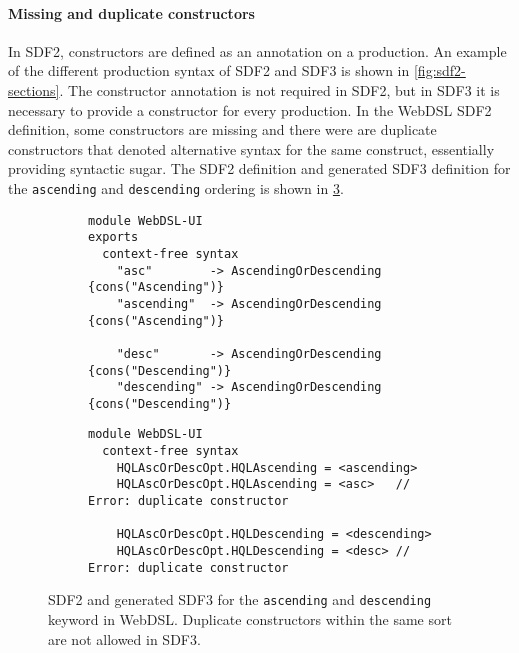       \paragraph{Missing and duplicate constructors} In SDF2, constructors are defined as an annotation on a production. An example of the different production syntax of SDF2 and SDF3 is shown in \cref{fig:sdf2-sections}. The constructor annotation is not required in SDF2, but in SDF3 it is necessary to provide a constructor for every production. In the WebDSL SDF2 definition, some constructors are missing and there were are duplicate constructors that denoted alternative syntax for the same construct, essentially providing syntactic sugar. The SDF2 definition and generated SDF3 definition for the \texttt{ascending} and \texttt{descending} ordering is shown in \cref{fig:sdf2-sdf3-asc-desc}.

      \begin{figure}
        \begin{subfigure}[b]{1\textwidth}
          \begin{verbatim}
module WebDSL-UI
exports
  context-free syntax
    "asc"        -> AscendingOrDescending {cons("Ascending")}
    "ascending"  -> AscendingOrDescending {cons("Ascending")}
    
    "desc"       -> AscendingOrDescending {cons("Descending")}
    "descending" -> AscendingOrDescending {cons("Descending")}
          \end{verbatim}
          \caption{\label{fig:sdf2-sdf3-asc-desc-sdf2}}
        \end{subfigure}
        \begin{subfigure}[b]{1\textwidth}
          \begin{verbatim}
module WebDSL-UI
  context-free syntax
    HQLAscOrDescOpt.HQLAscending = <ascending>
    HQLAscOrDescOpt.HQLAscending = <asc>   // Error: duplicate constructor

    HQLAscOrDescOpt.HQLDescending = <descending>
    HQLAscOrDescOpt.HQLDescending = <desc> // Error: duplicate constructor
          \end{verbatim}
          \caption{\label{fig:sdf2-sdf3-asc-desc-sdf3}}
        \end{subfigure}
        \caption{\label{fig:sdf2-sdf3-asc-desc}SDF2 and generated SDF3 for the \texttt{ascending} and \texttt{descending} keyword in WebDSL. Duplicate constructors within the same sort are not allowed in SDF3.}
      \end{figure}
      

